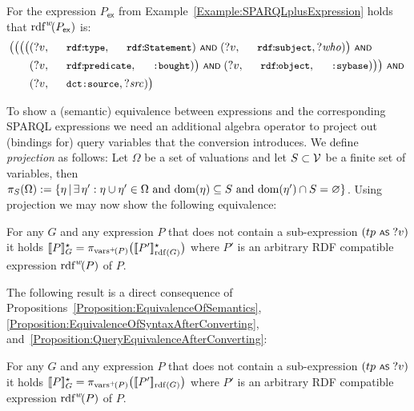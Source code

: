 \begin{example} \label{Example:ConvertingSPARQLplusToSPARQL}
	For the {\SPARQLplus} expression $P_\mathsf{ex}$ from Example~\ref{Example:SPARQLplusExpression} holds that $\mathrm{rdf}^{w}\!(P_\mathsf{ex})$ is:
	\begin{align*}
		\bigl( \bigl( \bigl( \bigl( & (?v,\mathTinyRDF{rdf\!:\!type},\mathTinyRDF{rdf\!:\!Statement}) \OpAND (?v,\mathTinyRDF{rdf\!:\!subject},?\mathit{who}) \bigr) \OpAND \\
		& (?v,\mathTinyRDF{rdf\!:\!predicate},\mathTinyRDF{:bought}) \bigr) \OpAND (?v,\mathTinyRDF{rdf\!:\!object},\mathTinyRDF{:sybase}) \bigr) \bigr) \OpAND \\
		& (?v , \mathTinyRDF{dct:source} , ?\mathit{src}) \bigr)	
	\end{align*}
\end{example}

\noindent
To show a (semantic) equivalence between {\SPARQLplus} expressions and the corresponding SPARQL expressions we need an additional algebra operator to project out (bindings for) query variables that the conversion introduces. We define \emph{projection} as follows: Let $\Omega$ be a set of valuations and let $S \subset \mathcal{V}$ be a finite set of variables, then $\pi_S ( \Omega ) := \lbrace \eta \,|\, \exists \, \eta' : \eta \cup \eta' \in \Omega \text{ and } \mathrm{dom}(\eta) \subseteq S \text{ and } \mathrm{dom}(\eta') \cap S = \varnothing \rbrace$.
Using projection we may now show the following equivalence:

\begin{proposition} \label{Proposition:QueryEquivalenceAfterConverting}
	For any {\RDFplusGraph} $G$ and any {\SPARQLplus} expression $P$ that does not contain a sub-expression
	$(tp \text{ \normalfont\scriptsize\textsf{AS} } ?v)$ it holds $[\![P]\!]^\star_{G} = \pi_{\mathrm{vars}^+\!(P)}\bigl( [\![P']\!]^\star_{\mathrm{rdf}(G)} \bigr)$ where $P'$ is an arbitrary RDF compatible expression $\mathrm{rdf}^{w}\!(P)$ of $P$.
\end{proposition}

\noindent
The following result is a direct consequence of Propositions~\ref{Proposition:EquivalenceOfSemantics}, \ref{Proposition:EquivalenceOfSyntaxAfterConverting}, and~\ref{Proposition:QueryEquivalenceAfterConverting}:
\begin{corollary}
	For any {\RDFplusGraph} $G$ and any {\SPARQLplus} expression $P$ that does not contain a sub-expression
	$(tp \text{ \normalfont\scriptsize\textsf{AS} } ?v)$ it holds $[\![P]\!]^\star_{G} = \pi_{\mathrm{vars}^+\!(P)}\bigl( [\![P']\!]_{\mathrm{rdf}(G)} \bigr)$ where $P'$ is an arbitrary RDF compatible expression $\mathrm{rdf}^{w}\!(P)$ of $P$.
\end{corollary}

\noindent
{}